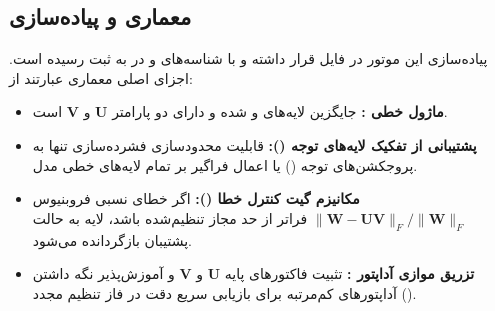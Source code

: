 \subsection{معماری و پیاده‌سازی}
پیاده‌سازی این موتور در فایل  قرار داشته و با شناسه‌های  و  در  به ثبت رسیده است. اجزای اصلی معماری عبارتند از:
\begin{itemize}
    \item \textbf{ماژول خطی :} جایگزین لایه‌های  و  شده و دارای دو پارامتر $\mathbf{U}$ و $\mathbf{V}$ است.
    \item \textbf{پشتیبانی از تفکیک لایه‌های توجه ():} قابلیت محدودسازی فشرده‌سازی تنها به پروجکشن‌های توجه () یا اعمال فراگیر بر تمام لایه‌های خطی مدل.
    \item \textbf{مکانیزم گیت کنترل خطا ():} اگر خطای نسبی فروبنیوس $\|\mathbf{W} - \mathbf{U}\mathbf{V}\|_F / \|\mathbf{W}\|_F$ فراتر از حد مجاز تنظیم‌شده باشد، لایه به حالت پشتیبان بازگردانده می‌شود.
    \item \textbf{تزریق موازی آداپتور :} تثبیت فاکتورهای پایه $\mathbf{U}$ و $\mathbf{V}$ و آموزش‌پذیر نگه داشتن آداپتورهای کم‌مرتبه  برای بازیابی سریع دقت در فاز تنظیم مجدد ().
\end{itemize}
